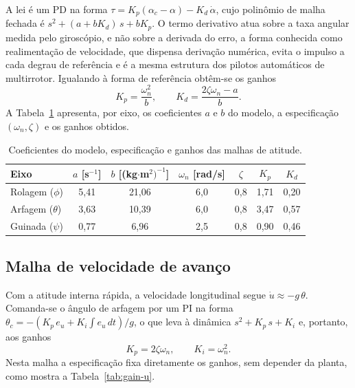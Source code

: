 A lei é um PD na forma $\tau=K_p(\alpha_c-\alpha)-K_d\,\dot{\alpha}$, cujo polinômio de malha fechada é $s^2+(a+bK_d)\,s+bK_p$. {\color{blue}O termo derivativo atua sobre a taxa angular medida pelo giroscópio, e não sobre a derivada do erro, a forma conhecida como realimentação de velocidade, que dispensa derivação numérica, evita o impulso a cada degrau de referência e é a mesma estrutura dos pilotos automáticos de multirrotor.} Igualando à forma de referência obtêm-se os ganhos
\begin{equation}
K_p=\frac{\omega_n^2}{b}, \qquad K_d=\frac{2\zeta\omega_n-a}{b}.
\label{eq:gain-att}
\end{equation}
A Tabela~\ref{tab:gain-att} apresenta, por eixo, os coeficientes $a$ e $b$ do modelo, a especificação $(\omega_n,\zeta)$ e os ganhos obtidos.

\begin{table}[ht]
\centering
\caption{Coeficientes do modelo, especificação e ganhos das malhas de atitude.}
\label{tab:gain-att}
\begin{tabular}{l c c c c c c}
\toprule
Eixo & $a$ [s$^{-1}$] & $b$ [(kg$\cdot$m$^2)^{-1}$] & $\omega_n$ [rad/s] & $\zeta$ & $K_p$ & $K_d$ \\
\midrule
Rolagem ($\phi$)   & {\color{blue}5,41} & {\color{blue}21,06} & 6,0 & 0,8 & {\color{blue}1,71} & {\color{blue}0,20} \\
Arfagem ($\theta$) & {\color{blue}3,63} & {\color{blue}10,39} & 6,0 & 0,8 & {\color{blue}3,47} & {\color{blue}0,57} \\
Guinada ($\psi$)   & {\color{blue}0,77} & {\color{blue}6,96} & 2,5 & 0,8 & {\color{blue}0,90} & {\color{blue}0,46} \\
\bottomrule
\end{tabular}
\end{table}

\subsection{Malha de velocidade de avanço}

Com a atitude interna rápida, a velocidade longitudinal segue $\dot{u}\approx-g\,\theta$. Comanda-se o ângulo de arfagem por um PI na forma $\theta_c=-\left(K_p\,e_u+K_i\!\int e_u\,dt\right)/g$, o que leva à dinâmica $s^2+K_p\,s+K_i$ e, portanto, aos ganhos
\begin{equation}
K_p=2\zeta\omega_n, \qquad K_i=\omega_n^2.
\label{eq:gain-u}
\end{equation}
Nesta malha a especificação fixa diretamente os ganhos, sem depender da planta, como mostra a Tabela~\ref{tab:gain-u}.


